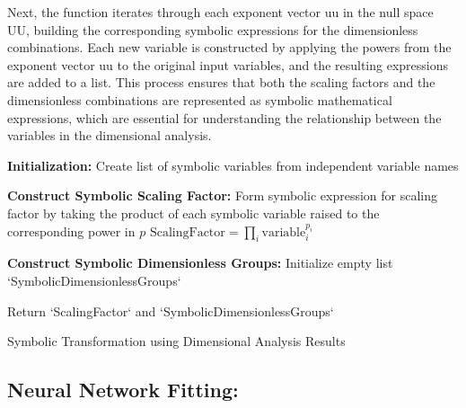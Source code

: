\documentclass{article}
\begin{document}
Next, the function iterates through each exponent vector uu in the null space UU, building the corresponding symbolic expressions for the dimensionless combinations. Each new variable is constructed by applying the powers from the exponent vector uu to the original input variables, and the resulting expressions are added to a list. This process ensures that both the scaling factors and the dimensionless combinations are represented as symbolic mathematical expressions, which are essential for understanding the relationship between the variables in the dimensional analysis.\\



\begin{algorithm}[H]
\SetAlgoLined
{}

\textbf{Initialization:}\;
Create list of symbolic variables from independent variable names\;

\textbf{Construct Symbolic Scaling Factor:}\;
Form symbolic expression for scaling factor by taking the product of each symbolic variable raised to the corresponding power in \(p\)\;
\( \text{ScalingFactor} = \prod_{i} \text{variable}_i^{p_i} \)\;

\textbf{Construct Symbolic Dimensionless Groups:}\;
Initialize empty list `SymbolicDimensionlessGroups`\;

Return `ScalingFactor` and `SymbolicDimensionlessGroups`\;

\caption{Symbolic Transformation using Dimensional Analysis Results}
\label{alg:symbolic_transformation} %
\end{algorithm}




\subsection{Neural Network Fitting: }
\end{document}
